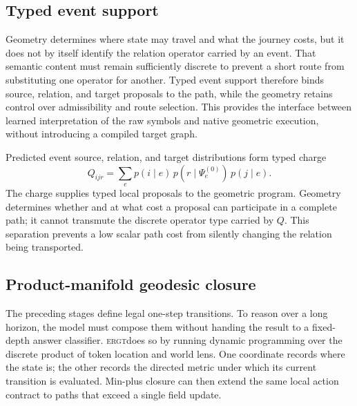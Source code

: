\documentclass[11pt]{article}
\newcommand{\ERGT}{\textsc{ergt}}
\begin{document}
\subsection{Typed event support}

Geometry determines where state may travel and what the journey costs, but it
does not by itself identify the relation operator carried by an event. That
semantic content must remain sufficiently discrete to prevent a short route
from substituting one operator for another. Typed event support therefore binds
source, relation, and target proposals to the path, while the geometry retains
control over admissibility and route selection. This provides the interface
between learned interpretation of the raw symbols and native geometric
execution, without introducing a compiled target graph.

Predicted event source, relation, and target distributions form typed charge
\begin{equation}
Q_{ijr}=\sum_e p(i\mid e)\,p(r\mid\Psi_e^{(0)})\,p(j\mid e).
\end{equation}
The charge supplies typed local proposals to the geometric program. Geometry
determines whether and at what cost a proposal can participate in a complete
path; it cannot transmute the discrete operator type carried by $Q$. This
separation prevents a low scalar path cost from silently changing the relation
being transported.

\subsection{Product-manifold geodesic closure}

The preceding stages define legal one-step transitions. To reason over a long
horizon, the model must compose them without handing the result to a fixed-depth
answer classifier. \ERGT does so by running dynamic programming over the
discrete product of token location and world lens. One coordinate records where
the state is; the other records the directed metric under which its current
transition is evaluated. Min-plus closure can then extend the same local action
contract to paths that exceed a single field update.
\end{document}
